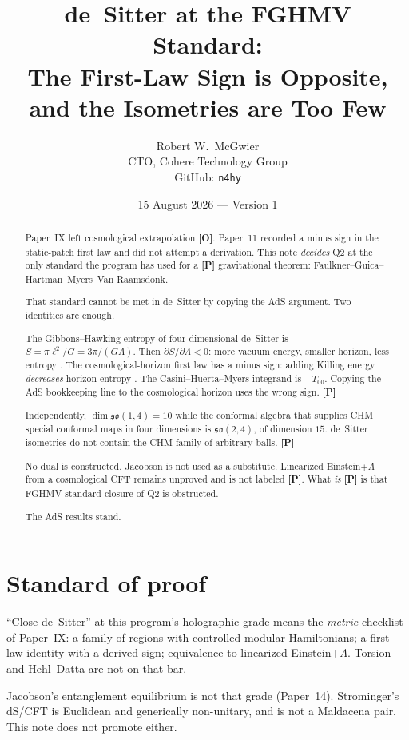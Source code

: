 \documentclass[11pt]{article}
\title{\textbf{de~Sitter at the FGHMV Standard:\\
The First-Law Sign is Opposite, and the Isometries are Too Few}}
\author{Robert W.\ McGwier\\
\small CTO, Cohere Technology Group\\
\small GitHub: \texttt{n4hy}}
\date{15 August 2026 --- Version 1}
\theoremstyle{definition}
\newcommand{\pP}{\textbf{[P]}}
\newcommand{\pO}{\textbf{[O]}}
\begin{document}
\maketitle

\begin{abstract}
\noindent
Paper~IX left cosmological extrapolation \pO{}. Paper~11 recorded a
minus sign in the static-patch first law and did not attempt a
derivation. This note \emph{decides} Q2 at the only standard the
program has used for a \pP{} gravitational theorem: Faulkner--Guica--
Hartman--Myers--Van Raamsdonk.

That standard cannot be met in de~Sitter by copying the AdS
argument. Two identities are enough.

The Gibbons--Hawking entropy of four-dimensional de~Sitter is
$S=\pi\ell^2/G=3\pi/(G\Lambda)$. Then $\partial S/\partial\Lambda<0$:
more vacuum energy, smaller horizon, less entropy
\cite{GibbonsHawking1977}. The cosmological-horizon first law has a
minus sign: adding Killing energy \emph{decreases} horizon entropy
\cite{Banihashemi2023}. The Casini--Huerta--Myers integrand is
$+T_{00}$. Copying the AdS bookkeeping line to the cosmological
horizon uses the wrong sign. \pP{}

Independently, $\dim\mathfrak{so}(1,4)=10$ while the conformal
algebra that supplies CHM special conformal maps in four dimensions
is $\mathfrak{so}(2,4)$, of dimension $15$. de~Sitter isometries do
not contain the CHM family of arbitrary balls. \pP{}

No dual is constructed. Jacobson is not used as a substitute.
Linearized Einstein$+\Lambda$ from a cosmological CFT remains
unproved and is not labeled \pP{}. What \emph{is} \pP{} is that
FGHMV-standard closure of Q2 is obstructed.

The AdS results stand.
\end{abstract}

\section*{Standard of proof}

``Close de~Sitter'' at this program's holographic grade means the
\emph{metric} checklist of Paper~IX: a family of regions with
controlled modular Hamiltonians; a first-law identity with a derived
sign; equivalence to linearized Einstein$+\Lambda$. Torsion and
Hehl--Datta are not on that bar.

Jacobson's entanglement equilibrium \cite{Jacobson2016} is not that
grade (Paper~14). Strominger's dS/CFT \cite{Strominger2001} is
Euclidean and generically non-unitary, and is not a Maldacena pair.
This note does not promote either.
\end{document}
